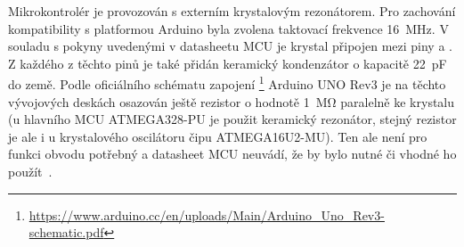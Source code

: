 Mikrokontrolér je provozován s externím krystalovým rezonátorem. Pro zachování
kompatibility s platformou Arduino byla zvolena taktovací frekvence
\SI{16}{\mega\hertz}. V souladu s pokyny uvedenými v datasheetu MCU je krystal
připojen mezi piny  a . Z každého z těchto pinů je
také přidán keramický kondenzátor o kapacitě \SI{22}{\pico\farad} do země.
Podle oficiálního schématu zapojení
\footnote{\url{https://www.arduino.cc/en/uploads/Main/Arduino_Uno_Rev3-schematic.pdf}}
Arduino UNO Rev3 je na těchto vývojových deskách osazován ještě rezistor
o hodnotě \SI{1}{\mega\ohm} paralelně ke krystalu (u hlavního MCU ATMEGA328-PU
je použit keramický rezonátor, stejný rezistor je ale i u krystalového
oscilátoru čipu ATMEGA16U2-MU). Ten ale není pro funkci obvodu potřebný
a datasheet MCU neuvádí, že by bylo nutné či vhodné ho
použít~\cite{dshATmega328}.
